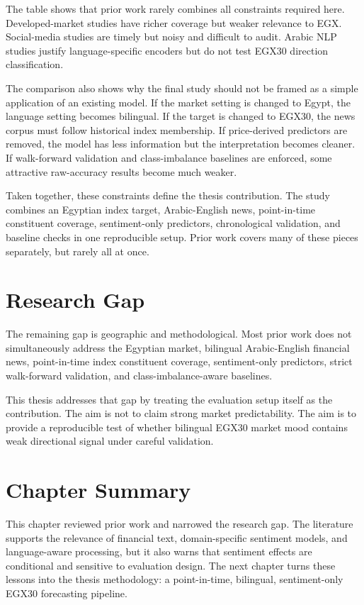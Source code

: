 The table shows that prior work rarely combines all constraints required here. Developed-market studies have richer coverage but weaker relevance to EGX. Social-media studies are timely but noisy and difficult to audit. Arabic NLP studies justify language-specific encoders but do not test EGX30 direction classification.

The comparison also shows why the final study should not be framed as a simple application of an existing model. If the market setting is changed to Egypt, the language setting becomes bilingual. If the target is changed to EGX30, the news corpus must follow historical index membership. If price-derived predictors are removed, the model has less information but the interpretation becomes cleaner. If walk-forward validation and class-imbalance baselines are enforced, some attractive raw-accuracy results become much weaker.

Taken together, these constraints define the thesis contribution. The study combines an Egyptian index target, Arabic-English news, point-in-time constituent coverage, sentiment-only predictors, chronological validation, and baseline checks in one reproducible setup. Prior work covers many of these pieces separately, but rarely all at once.

\section{Research Gap}

The remaining gap is geographic and methodological. Most prior work does not simultaneously address the Egyptian market, bilingual Arabic-English financial news, point-in-time index constituent coverage, sentiment-only predictors, strict walk-forward validation, and class-imbalance-aware baselines.

This thesis addresses that gap by treating the evaluation setup itself as the contribution. The aim is not to claim strong market predictability. The aim is to provide a reproducible test of whether bilingual EGX30 market mood contains weak directional signal under careful validation.

\section{Chapter Summary}

This chapter reviewed prior work and narrowed the research gap. The literature supports the relevance of financial text, domain-specific sentiment models, and language-aware processing, but it also warns that sentiment effects are conditional and sensitive to evaluation design. The next chapter turns these lessons into the thesis methodology: a point-in-time, bilingual, sentiment-only EGX30 forecasting pipeline.
